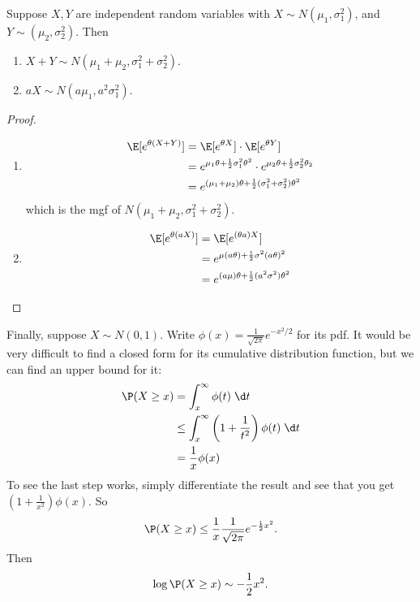 \documentclass[a4paper]{article}
\begin{document}
\begin{thm}
  Suppose $X, Y$ are independent random variables with $X\sim N(\mu_1, \sigma_1^2)$, and $Y\sim (\mu_2, \sigma_2^2)$. Then
  \begin{enumerate}
    \item $X + Y \sim N(\mu_1 + \mu_2 , \sigma_1^2 + \sigma_2^2)$.
    \item $aX \sim N(a\mu_1, a^2 \sigma_1^2)$.
  \end{enumerate}
\end{thm}

\begin{proof}\leavevmode
  \begin{enumerate}
    \item
      \begin{align*}
        \E[e^{\theta(X + Y)}] &= \E[e^{\theta X}] \cdot \E[e^{\theta Y}]\\
        &= e^{\mu_1 \theta + \frac{1}{2}\sigma_1^2\theta^2} \cdot e^{\mu_2 \theta + \frac{1}{2}\sigma_2^2 \theta_2}\\
        &= e^{(\mu_1 + \mu_2)\theta + \frac{1}{2}(\sigma_1^2 + \sigma_2^2)\theta^2}
      \end{align*}
      which is the mgf of $N(\mu_1 + \mu_2, \sigma_1^2 + \sigma_2^2)$.
    \item
      \begin{align*}
        \E[e^{\theta (aX)}] &= \E[e^{(\theta a)X}]\\
        &= e^{\mu(a\theta) + \frac{1}{2}\sigma^2 (a \theta)^2}\\
        &= e^{(a\mu)\theta + \frac{1}{2}(a^2\sigma^2)\theta^2}
      \end{align*}
  \end{enumerate}
\end{proof}

Finally, suppose $X\sim N(0, 1)$. Write $\phi(x) = \frac{1}{\sqrt{2\pi}} e^{-x^2/2}$ for its pdf. It would be very difficult to find a closed form for its cumulative distribution function, but we can find an upper bound for it:
\begin{align*}
  \P(X \geq x) &= \int_x^\infty \phi(t)\;\d t\\
  &\leq \int_x^\infty \left(1 + \frac{1}{t^2}\right)\phi(t)\;\d t \\
  &= \frac{1}{x}\phi(x)
\end{align*}
To see the last step works, simply differentiate the result and see that you get $\left(1 + \frac{1}{x^2}\right)\phi(x)$.
So
\[
  \P(X \geq x) \leq \frac{1}{x}\frac{1}{\sqrt{2\pi}}e^{-\frac{1}{2}x^2}.
\]
Then
\[
  \log \P(X \geq x)\sim -\frac{1}{2}x^2.
\]
\end{document}
